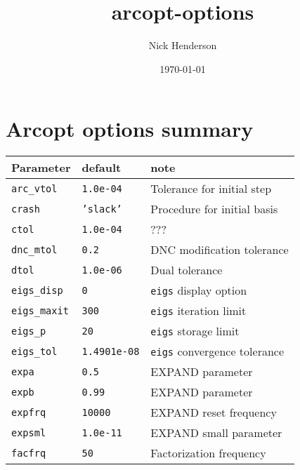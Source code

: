 \documentclass[11pt]{article}
\title{arcopt-options}
\author{Nick Henderson}
\date{\today}
\begin{document}
\maketitle

\setcounter{tocdepth}{3}
\tableofcontents
\vspace*{1cm}
\section{Arcopt options summary}
\label{sec-1}



\begin{center}
\begin{tabular}{|l|l|l|}
\hline
 Parameter               &  default              &  note                                 \\
\hline
 \texttt{arc\_vtol}      &  \texttt{1.0e-04}     &  Tolerance for initial step           \\
 \texttt{crash}          &  \texttt{'slack'}     &  Procedure for initial basis          \\
 \texttt{ctol}           &  \texttt{1.0e-04}     &  ???                                  \\
 \texttt{dnc\_mtol}      &  \texttt{0.2}         &  DNC modification tolerance           \\
 \texttt{dtol}           &  \texttt{1.0e-06}     &  Dual tolerance                       \\
 \texttt{eigs\_disp}     &  \texttt{0}           &  \texttt{eigs} display option         \\
 \texttt{eigs\_maxit}    &  \texttt{300}         &  \texttt{eigs} iteration limit        \\
 \texttt{eigs\_p}        &  \texttt{20}          &  \texttt{eigs} storage limit          \\
 \texttt{eigs\_tol}      &  \texttt{1.4901e-08}  &  \texttt{eigs} convergence tolerance  \\
 \texttt{expa}           &  \texttt{0.5}         &  EXPAND parameter                     \\
 \texttt{expb}           &  \texttt{0.99}        &  EXPAND parameter                     \\
 \texttt{expfrq}         &  \texttt{10000}       &  EXPAND reset frequency               \\
 \texttt{expsml}         &  \texttt{1.0e-11}     &  EXPAND small parameter               \\
 \texttt{facfrq}         &  \texttt{50}          &  Factorization frequency              \\

\end{tabular}
\end{center}
\end{document}
